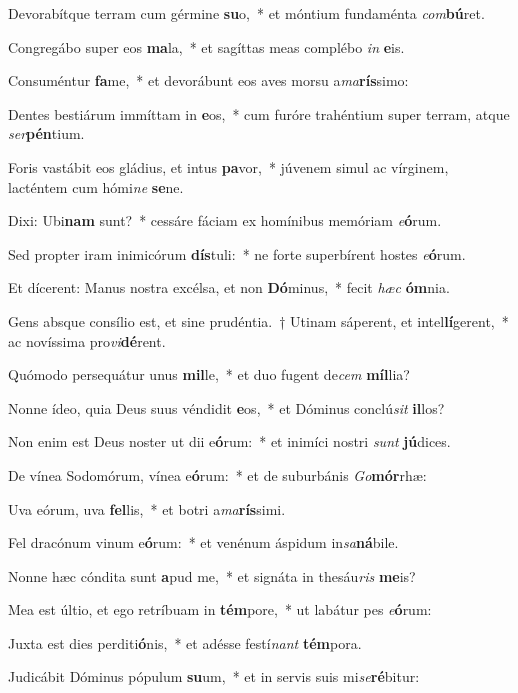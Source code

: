 \item Devorabítque terram cum gérmine \textbf{su}o,~* et móntium fundaménta \textit{com}\textbf{bú}ret.
\item Congregábo super eos \textbf{ma}la,~* et sagíttas meas complébo \textit{in} \textbf{e}is.
\item Consuméntur \textbf{fa}me,~* et devorábunt eos aves morsu a\textit{ma}\textbf{rís}simo:
\item Dentes bestiárum immíttam in \textbf{e}os,~* cum furóre trahéntium super terram, atque \textit{ser}\textbf{pén}tium.
\item Foris vastábit eos gládius, et intus \textbf{pa}vor,~* júvenem simul ac vírginem, lacténtem cum hómi\textit{ne} \textbf{se}ne.
\item Dixi: Ubi\textbf{nam} sunt?~* cessáre fáciam ex homínibus memóriam \textit{e}\textbf{ó}rum.
\item Sed propter iram inimicórum \textbf{dís}tuli:~* ne forte superbírent hostes \textit{e}\textbf{ó}rum.
\item Et dícerent: Manus nostra excélsa, et non \textbf{Dó}minus,~* fecit \textit{hæc} \textbf{óm}nia.
\item Gens absque consílio est, et sine prudéntia.~† Utinam sáperent, et intel\textbf{lí}gerent,~* ac novíssima pro\textit{vi}\textbf{dé}rent.
\item Quómodo persequátur unus \textbf{mil}le,~* et duo fugent de\textit{cem} \textbf{míl}lia?
\item Nonne ídeo, quia Deus suus véndidit \textbf{e}os,~* et Dóminus conclú\textit{sit} \textbf{il}los?
\item Non enim est Deus noster ut dii e\textbf{ó}rum:~* et inimíci nostri \textit{sunt} \textbf{jú}dices.
\item De vínea Sodomórum, vínea e\textbf{ó}rum:~* et de suburbánis \textit{Go}\textbf{mór}rhæ:
\item Uva eórum, uva \textbf{fel}lis,~* et botri a\textit{ma}\textbf{rís}simi.
\item Fel dracónum vinum e\textbf{ó}rum:~* et venénum áspidum in\textit{sa}\textbf{ná}bile.
\item Nonne hæc cóndita sunt \textbf{a}pud me,~* et signáta in thesáu\textit{ris} \textbf{me}is?
\item Mea est últio, et ego retríbuam in \textbf{tém}pore,~* ut labátur pes \textit{e}\textbf{ó}rum:
\item Juxta est dies perditi\textbf{ó}nis,~* et adésse festí\textit{nant} \textbf{tém}pora.
\item Judicábit Dóminus pópulum \textbf{su}um,~* et in servis suis mi\textit{se}\textbf{ré}bitur:
